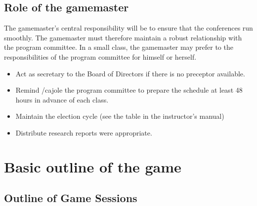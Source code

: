 
\subsection{Role of the gamemaster}
\label{roleofthegamemaster}

The gamemaster's central responsibility will be to ensure that the conferences run smoothly. The gamemaster must therefore maintain a robust relationship with the program committee. In a small class, the gamemaster may prefer to the responsibilities of the program committee for himself or herself.

\begin{itemize}
\item Act as secretary to the Board of Directors if there is no preceptor available.

\item Remind \slash  cajole the program committee to prepare the schedule at least 48 hours in advance of each class.

\item Maintain the election cycle (see the table in the instructor's manual)

\item Distribute research reports were appropriate.

\end{itemize}

\section{Basic outline of the game}
\label{basicoutlineofthegame}

\subsection{Outline of Game Sessions}
\label{outlineofgamesessions}

